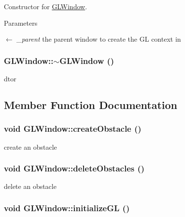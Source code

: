 Constructor for \hyperlink{classGLWindow}{GLWindow}. 
\begin{DoxyParams}{Parameters}
\item[\mbox{$\leftarrow$} {\em \_\-parent}]the parent window to create the GL context in \end{DoxyParams}
\hypertarget{classGLWindow_a2eeaea2148f4f72344edd6d1bac9759b}{
\subsubsection[{$\sim$GLWindow}]{\setlength{\rightskip}{0pt plus 5cm}GLWindow::$\sim$GLWindow ()}}
\label{classGLWindow_a2eeaea2148f4f72344edd6d1bac9759b}


dtor 

\subsection{Member Function Documentation}
\hypertarget{classGLWindow_a9746b445fc2d9d4f01443b838619884e}{
\subsubsection[{createObstacle}]{\setlength{\rightskip}{0pt plus 5cm}void GLWindow::createObstacle ()}}
\label{classGLWindow_a9746b445fc2d9d4f01443b838619884e}


create an obstacle \hypertarget{classGLWindow_a602754667c54e2dd5782b7e179ca4b20}{
\subsubsection[{deleteObstacles}]{\setlength{\rightskip}{0pt plus 5cm}void GLWindow::deleteObstacles ()}}
\label{classGLWindow_a602754667c54e2dd5782b7e179ca4b20}


delete an obstacle \hypertarget{classGLWindow_a39e39761cd7323806917a217cc7caea5}{
\subsubsection[{initializeGL}]{\setlength{\rightskip}{0pt plus 5cm}void GLWindow::initializeGL ()}}
\label{classGLWindow_a39e39761cd7323806917a217cc7caea5}


